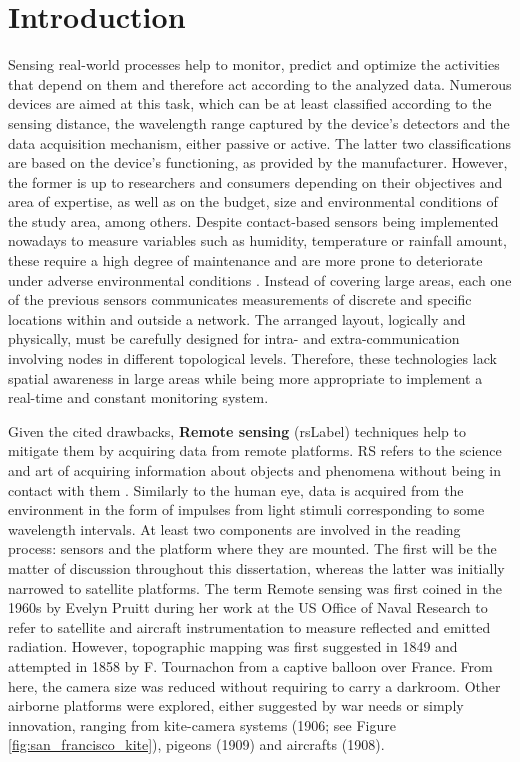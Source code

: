\setchapterpreamble[u]{\margintoc}
\chapter{Introduction}

Sensing real-world processes help to monitor, predict and optimize the activities that depend on them and therefore act according to the analyzed data. Numerous devices are aimed at this task, which can be at least classified according to the sensing distance, the wavelength range captured by the device's detectors and the data acquisition mechanism, either passive or active. The latter two classifications are based on the device's functioning, as provided by the manufacturer. However, the former is up to researchers and consumers depending on their objectives and area of expertise, as well as on the budget, size and environmental conditions of the study area, among others. Despite contact-based sensors being implemented nowadays to measure variables such as humidity, temperature or rainfall amount, these require a high degree of maintenance and are more prone to deteriorate under adverse environmental conditions \cite{silva_low-cost_2019, morais_versatile_2021}. Instead of covering large areas, each one of the previous sensors communicates measurements of discrete and specific locations within and outside a network. The arranged layout, logically and physically, must be carefully designed for intra- and extra-communication involving nodes in different topological levels. Therefore, these technologies lack spatial awareness in large areas while being more appropriate to implement a real-time and constant monitoring system. 

Given the cited drawbacks, \textbf{\gls{Remote sensing}} (\acrfull{rsLabel}) techniques help to mitigate them by acquiring data from remote platforms. RS refers to the science and art of acquiring information about objects and phenomena without being in contact with them \cite{lillesand_remote_2015}. Similarly to the human eye, data is acquired from the environment in the form of impulses from light stimuli corresponding to some wavelength intervals. At least two components are involved in the reading process: sensors and the platform where they are mounted. The first will be the matter of discussion throughout this dissertation, whereas the latter was initially narrowed to satellite platforms. The term \gls{Remote sensing} was first coined in the 1960s by Evelyn Pruitt during her work at the US Office of Naval Research to refer to satellite and aircraft instrumentation to measure reflected and emitted radiation. However, topographic mapping was first suggested in 1849 and attempted in 1858 by F. Tournachon from a captive balloon over France. From here, the camera size was reduced without requiring to carry a darkroom. Other airborne platforms were explored, either suggested by war needs or simply innovation, ranging from kite-camera systems (1906; see Figure \ref{fig:san_francisco_kite}), pigeons (1909) and aircrafts (1908).


